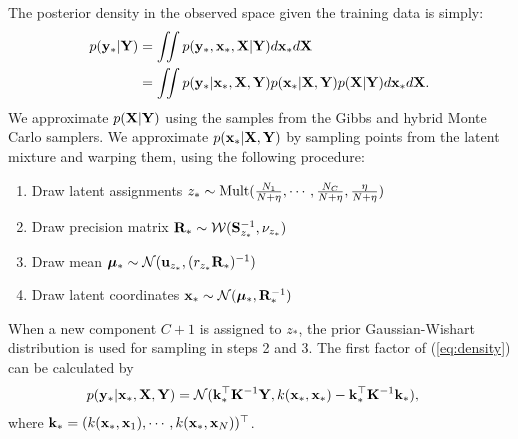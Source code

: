 The posterior density in the observed space given the training data is simply:
\begin{align}
p({\bf{y}}_{*}|\mathbf{Y})
& = \int \!\!\! \int p({\bf{y}}_{*},{\bf{x}}_{*},\mathbf{X}|\mathbf{Y})d{\bf{x}}_{*}d\mathbf{X} \nonumber\\
& = \int\!\!\! \int p({\bf{y}}_{*}|{\bf{x}}_{*},\mathbf{X},\mathbf{Y})p({\bf{x}}_{*}|\mathbf{X},\mathbf{Y})p(\mathbf{X}|\mathbf{Y})d{\bf{x}}_{*}d\mathbf{X}.
\label{eq:density}
\end{align}
We approximate $p(\mathbf{X}|\mathbf{Y})$ using the samples from the Gibbs and hybrid Monte Carlo samplers.
We approximate $p({\bf{x}}_{*}|\mathbf{X},\mathbf{Y})$ by sampling points from the latent mixture and warping them, using the following procedure:
\begin{enumerate}
\item Draw latent assignments
$z_{*} \sim {\rm Mult}(\frac{N_{1}}{N+\eta},\cdots,\frac{N_{C}}{N+\eta},\frac{\eta}{N+\eta})$
\item Draw precision matrix
$\mathbf{R}_{*} \sim {\cal W}(\mathbf{S}^{-1}_{z_{*}},\nu_{z_{*}})$
\item Draw mean
$\bm{\mu}_{*} \sim {\cal N}({\bf{u}}_{z_{*}},(r_{z_{*}}\mathbf{R}_{*})^{-1})$
\item Draw latent coordinates
${\bf{x}}_{*} \sim {\cal N}(\bm{\mu}_{*},\mathbf{R}_{*}^{-1})$
\end{enumerate}
When a new component $C+1$ is assigned to $z_{*}$, 
the prior Gaussian-Wishart distribution is used for sampling in steps 2 and 3.
The first factor of (\ref{eq:density}) can be calculated by
\begin{align}
p({\bf{y}}_{*}|{\bf{x}}_{*},\mathbf{X},\mathbf{Y})
& = {\cal N}({\bf{k}}_{*}^{\top}\mathbf{K}^{-1}\mathbf{Y},k({\bf{x}}_{*},{\bf{x}}_{*})-{\bf{k}}_{*}^{\top}\mathbf{K}^{-1}{\bf{k}}_{*}),
\end{align}
where
${\bf{k}}_{*}=(k({\bf{x}}_{*},{\bf{x}}_{1}),\cdots,k({\bf{x}}_{*},{\bf{x}}_{N}))^{\top}$.
